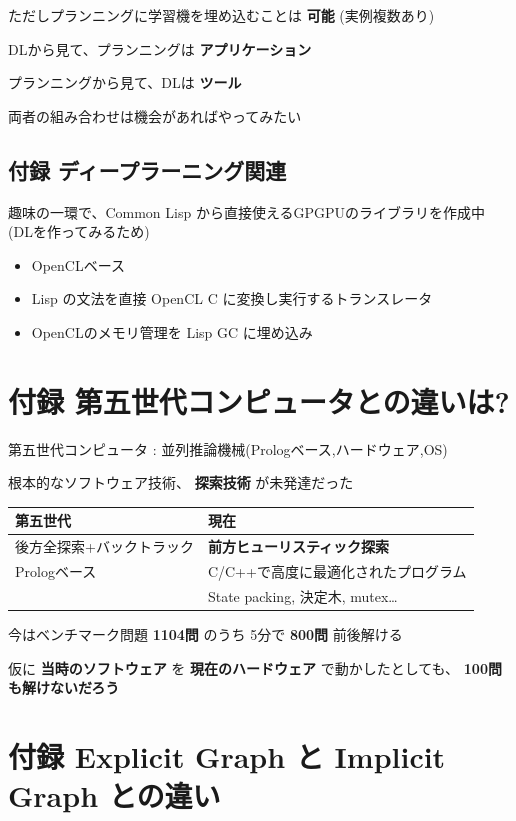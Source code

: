 ただしプランニングに学習機を埋め込むことは \textbf{可能} (実例複数あり)

DLから見て、プランニングは \textbf{アプリケーション}

プランニングから見て、DLは \textbf{ツール}

両者の組み合わせは機会があればやってみたい

\subsection{付録 ディープラーニング関連}
\label{sec-15-1}

趣味の一環で、Common Lisp から直接使えるGPGPUのライブラリを作成中 (DLを作ってみるため)

\begin{itemize}
\item OpenCLベース
\item Lisp の文法を直接 OpenCL C に変換し実行するトランスレータ
\item OpenCLのメモリ管理を Lisp GC に埋め込み
\end{itemize}

\section{付録 第五世代コンピュータとの違いは?}
\label{sec-16}

第五世代コンピュータ : 並列推論機械(Prologベース,ハードウェア,OS)

根本的なソフトウェア技術、 \textbf{探索技術} が未発達だった

\begin{center}
\begin{tabular}{ll}
第五世代 & 現在\\
\hline
後方全探索+バックトラック & \textbf{前方ヒューリスティック探索}\\
Prologベース & C/C++で高度に最適化されたプログラム\\
 & State packing, 決定木, mutex\ldots{}\\
\end{tabular}
\end{center}

今はベンチマーク問題 \textbf{1104問} のうち 5分で \textbf{800問} 前後解ける

仮に \textbf{当時のソフトウェア} を \textbf{現在のハードウェア} で動かしたとしても、 \textbf{100問も解けないだろう}

\section{付録 Explicit Graph と Implicit Graph との違い}
\label{sec-17}


